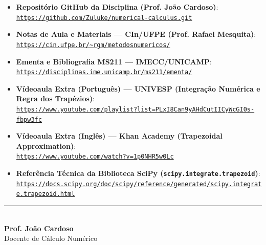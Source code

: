 \documentclass[11pt,a4paper]{article}
\begin{document}
\begin{itemize}[leftmargin=1.4em]\small
    \item \textbf{Repositório GitHub da Disciplina (Prof. João Cardoso)}: \\
    \href{https://github.com/Zuluke/numerical-calculus.git}{\nolinkurl{https://github.com/Zuluke/numerical-calculus.git}}
    \item \textbf{Notas de Aula e Materiais --- CIn/UFPE (Prof. Rafael Mesquita)}: \\
    \href{https://cin.ufpe.br/~rgm/metodosnumericos/}{\nolinkurl{https://cin.ufpe.br/~rgm/metodosnumericos/}}
    \item \textbf{Ementa e Bibliografia MS211 --- IMECC/UNICAMP}: \\
    \href{https://disciplinas.ime.unicamp.br/ms211/ementa/}{\nolinkurl{https://disciplinas.ime.unicamp.br/ms211/ementa/}}
    \item \textbf{Vídeoaula Extra (Português) --- UNIVESP (Integração Numérica e Regra dos Trapézios)}: \\
    \href{https://www.youtube.com/playlist?list=PLxI8Can9yAHdCutIICyWcGI0s-fbpw3fc}{\nolinkurl{https://www.youtube.com/playlist?list=PLxI8Can9yAHdCutIICyWcGI0s-fbpw3fc}}
    \item \textbf{Vídeoaula Extra (Inglês) --- Khan Academy (Trapezoidal Approximation)}: \\
    \href{https://www.youtube.com/watch?v=1p0NHR5w0Lc}{\nolinkurl{https://www.youtube.com/watch?v=1p0NHR5w0Lc}}
    \item \textbf{Referência Técnica da Biblioteca SciPy (\texttt{scipy.integrate.trapezoid})}: \\
    \href{https://docs.scipy.org/doc/scipy/reference/generated/scipy.integrate.trapezoid.html}{\nolinkurl{https://docs.scipy.org/doc/scipy/reference/generated/scipy.integrate.trapezoid.html}}
\end{itemize}

\nocite{*}
\printbibliography[title={Referências Bibliográficas}]

\vspace{0.8cm}
\begin{flushright}
\rule{6.5cm}{0.6pt}\\
\textbf{Prof. João Cardoso}\\
Docente de Cálculo Numérico
\end{flushright}
\end{document}
